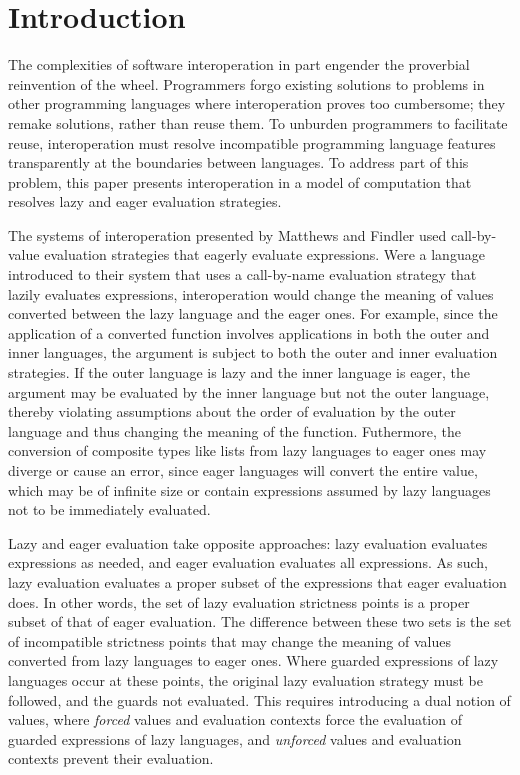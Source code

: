 \section{Introduction}

The complexities of software interoperation in part engender the proverbial reinvention of the wheel. Programmers forgo existing solutions to problems in other programming languages where interoperation proves too cumbersome; they remake solutions, rather than reuse them. To unburden programmers to facilitate reuse, interoperation must resolve incompatible programming language features transparently at the boundaries between languages. To address part of this problem, this paper presents interoperation in a model of computation that resolves lazy and eager evaluation strategies.

The systems of interoperation presented by Matthews and Findler \cite{matthews07} used call-by-value evaluation strategies that eagerly evaluate expressions. Were a language introduced to their system that uses a call-by-name evaluation strategy that lazily evaluates expressions, interoperation would change the meaning of values converted between the lazy language and the eager ones. For example, since the application of a converted function involves applications in both the outer and inner languages, the argument is subject to both the outer and inner evaluation strategies. If the outer language is lazy and the inner language is eager, the argument may be evaluated by the inner language but not the outer language, thereby violating assumptions about the order of evaluation by the outer language and thus changing the meaning of the function. Futhermore, the conversion of composite types like lists from lazy languages to eager ones may diverge or cause an error, since eager languages will convert the entire value, which may be of infinite size or contain expressions assumed by lazy languages not to be immediately evaluated.

Lazy and eager evaluation take opposite approaches: lazy evaluation evaluates expressions as needed, and eager evaluation evaluates all expressions. As such, lazy evaluation evaluates a proper subset of the expressions that eager evaluation does. In other words, the set of lazy evaluation strictness points is a proper subset of that of eager evaluation. The difference between these two sets is the set of incompatible strictness points that may change the meaning of values converted from lazy languages to eager ones. Where guarded expressions of lazy languages occur at these points, the original lazy evaluation strategy must be followed, and the guards not evaluated. This requires introducing a dual notion of values, where \emph{forced} values and evaluation contexts force the evaluation of guarded expressions of lazy languages, and \emph{unforced} values and evaluation contexts prevent their evaluation.